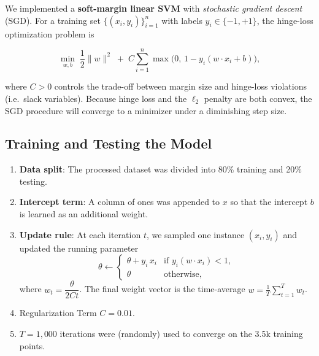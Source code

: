 \documentclass[12pt]{article}
\begin{document}
We implemented a \textbf{soft-margin linear SVM} with \textit{stochastic gradient descent} (SGD).  
For a training set $\{(x_i,y_i)\}_{i=1}^{n}$ with labels $y_i\in\{-1,+1\}$, the hinge-loss optimization problem is

\[
\min_{w,b}\;
\frac{1}{2}\lVert w\rVert^{2}
\;+\;
C\sum_{i=1}^{n}
\max\bigl(0,\,1 - y_i(w \cdot x_i + b)\bigr),
\]

where $C>0$ controls the trade-off between margin size and hinge-loss violations (i.e.\ slack variables).  
Because hinge loss and the $\ell_2$ penalty are both convex, the SGD procedure will converge to a minimizer under a diminishing step size.

\subsection{Training and Testing the Model}

\begin{enumerate}[label=\alph*)]
    \item \textbf{Data split}: The processed dataset was divided into 80\% training and 20\% testing.
    \item \textbf{Intercept term}: A column of ones was appended to $x$ so that the intercept $b$ is learned as an additional weight.
    \item \textbf{Update rule}: At each iteration $t$, we sampled one instance $(x_i,y_i)$ and updated the running parameter  
        \[
            \theta \leftarrow
            \begin{cases}
                \theta + y_i\,x_i &\text{if } y_i(w \cdot x_i)<1,\\[4pt]
                \theta &\text{otherwise},
            \end{cases}
        \]
        where $w_t=\dfrac{\theta}{2Ct}$.  
        The final weight vector is the time-average $\displaystyle w=\frac{1}{T}\sum_{t=1}^{T}w_t$.
    \item Regularization Term $C = 0.01$.
    \item $T=1{,}000$ iterations were (randomly) used to converge on the 3.5k training points.
\end{enumerate}
\end{document}
